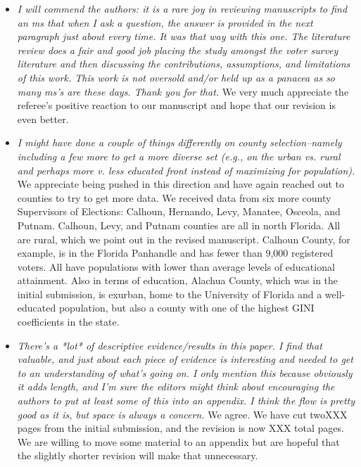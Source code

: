 \documentclass[12pt]{article}
\begin{document}
\begin{itemize}

\item \emph{I will commend the authors: it is a rare joy in reviewing
    manuscripts to find an ms that when I ask a question, the answer
    is provided in the next paragraph just about every time. It was
    that way with this one. The literature review does a fair and good
    job placing the study amongst the voter survey literature and then
    discussing the contributions, assumptions, and limitations of this
    work. This work is not oversold and/or held up as a panacea as so
    many ms's are these days. Thank you for that.}  We very much
  appreciate the referee's positive reaction to our manuscript and
  hope that our revision is even better.

\item \emph{I might have done a couple of things differently on county
    selection--namely including a few more to get a more diverse set
    (e.g., on the urban vs. rural and perhaps more v. less educated
    front instead of maximizing for population).}  We appreciate being
  pushed in this direction and have again reached out to counties to
  try to get more data.  We received data from six more county Supervisors
  of Elections: Calhoun, Hernando, Levy, Manatee, Osceola, and Putnam.  Calhoun, Levy, and Putnam counties are all
  in north Florida. All are rural, which we point out in the revised manuscript. Calhoun County, for example, is
  in the Florida Panhandle and has fewer than 9,000 registered voters.  All have populations with lower than average 
  levels of educational attainment.  Also in terms of education, Alachua County, which was in the initial submission, is exurban,  
  home to the University of Florida and a well-educated population, but also a county 
  with one of the highest GINI coefficients in the state. 


\item \emph{There's a *lot* of descriptive evidence/results in this
    paper. I find that valuable, and just about each piece of evidence
    is interesting and needed to get to an understanding of what's
    going on. I only mention this because obviously it adds length,
    and I'm sure the editors might think about encouraging the authors
    to put at least some of this into an appendix. I think the flow is
    pretty good as it is, but space is always a concern.}  We agree.
  We have cut twoXXX pages from the initial submission, and the
  revision is now XXX total pages.  We are willing to move some material
  to an appendix but are hopeful that the slightly shorter revision
  will make that unnecessary.


\end{itemize}
\end{document}
